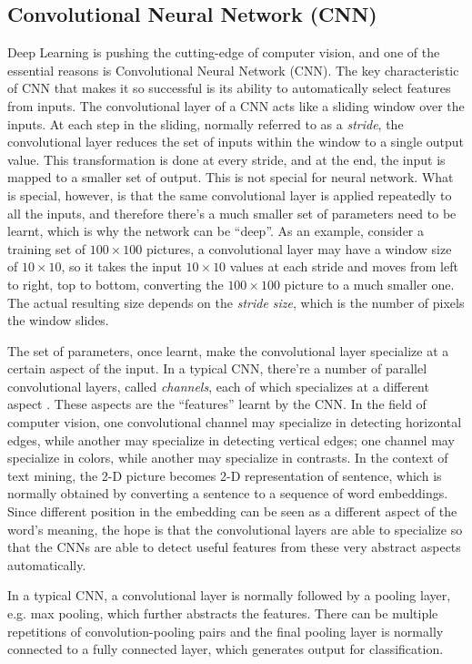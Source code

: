\subsection{Convolutional Neural Network (CNN)}

Deep Learning is pushing the cutting-edge of computer vision, and one of the essential reasons is Convolutional Neural Network (CNN). The key characteristic of CNN that makes it so successful is its ability to automatically select features from inputs. The convolutional layer of a CNN acts like a sliding window over the inputs. At each step in the sliding, normally referred to as a {\em stride}, the convolutional layer reduces the set of inputs within the window to a single output value. This transformation is done at every stride, and at the end, the input is mapped to a smaller set of output. This is not special for neural network. What is special, however, is that the same convolutional layer is applied repeatedly to all the inputs, and therefore there's a much smaller set of parameters need to be learnt, which is why the network can be ``deep''. As an example, consider a training set of $100 \times 100$ pictures, a convolutional layer may have a window size of $10 \times 10$, so it takes the input $10 \times 10$ values at each stride and moves from left to right, top to bottom, converting the $100 \times 100$ picture to a much smaller one. The actual resulting size depends on the {\em stride size}, which is the number of pixels the window slides. 

The set of parameters, once learnt, make the convolutional layer specialize at a certain aspect of the input. In a typical CNN, there're a number of parallel convolutional layers, called {\em channels}, each of which specializes at a different aspect \cite{}. These aspects are the ``features'' learnt by the CNN. In the field of computer vision, one convolutional channel may specialize in detecting horizontal edges, while another may specialize in detecting vertical edges; one channel may specialize in colors, while another may specialize in contrasts. In the context of text mining, the 2-D picture becomes 2-D representation of sentence, which is normally obtained by converting a sentence to a sequence of word embeddings. Since different position in the embedding can be seen as a different aspect of the word's meaning, the hope is that the convolutional layers are able to specialize so that the CNNs are able to detect useful features from these very abstract aspects automatically. 

In a typical CNN, a convolutional layer is normally followed by a pooling layer, e.g. max pooling, which further abstracts the features. There can be multiple repetitions of convolution-pooling pairs and the final pooling layer is normally connected to a fully connected layer, which generates output for classification.
